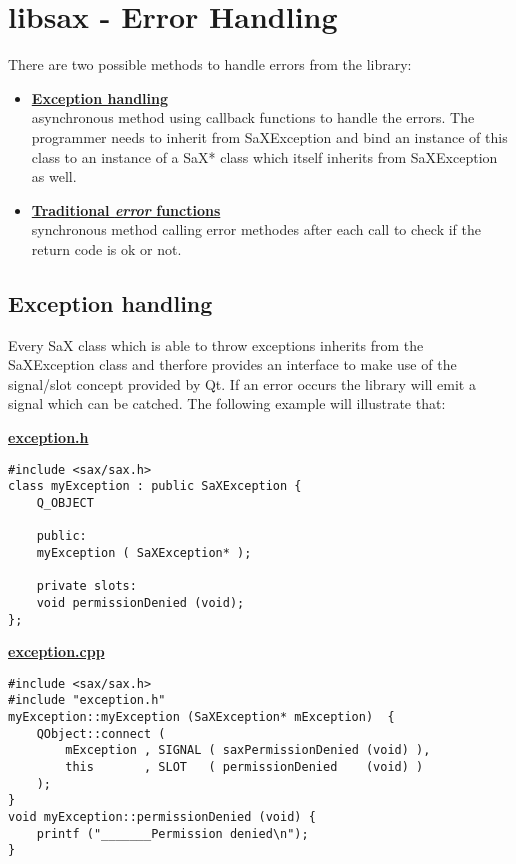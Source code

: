 \chapter{libsax - Error Handling}
\minitoc

There are two possible methods to handle errors from the library:
\begin{itemize}
\item \textbf{\underline{Exception handling}}\\
      asynchronous method using callback functions to handle the errors.
      The programmer needs to inherit from SaXException and bind an instance
      of this class to an instance of a SaX* class which itself inherits from
      SaXException as well.
\item \textbf{\underline{Traditional \textit{error} functions}}\\
      synchronous method calling error methodes after each call to check
      if the return code is ok or not. 
\end{itemize}
\section{Exception handling}
Every SaX class which is able to throw exceptions inherits from the 
SaXException class and therfore provides an interface to make use
of the signal/slot concept provided by Qt. If an error occurs the library
will emit a signal which can be catched. The following example will
illustrate that:

\textbf{\underline{exception.h}}

\begin{Command}{12cm}
\begin{small}
\begin{verbatim}
#include <sax/sax.h>
class myException : public SaXException {
    Q_OBJECT

    public:
    myException ( SaXException* );

    private slots:
    void permissionDenied (void);
};
\end{verbatim}
\end{small}
\end{Command}

\newpage

\textbf{\underline{exception.cpp}}

\begin{Command}{12cm}
\begin{small}
\begin{verbatim}
#include <sax/sax.h>
#include "exception.h"
myException::myException (SaXException* mException)  {
    QObject::connect (
        mException , SIGNAL ( saxPermissionDenied (void) ),
        this       , SLOT   ( permissionDenied    (void) )
    );
}
void myException::permissionDenied (void) {
    printf ("_______Permission denied\n");
}
\end{verbatim}
\end{small}
\end{Command}

